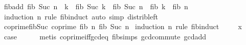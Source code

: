 \begin{isabellebody}
%
\isadelimproof
%
\endisadelimproof
%
\isadelimdocument
%
\endisadelimdocument
%
\isatagdocument
%
\isamarkuptrue%
%
\endisatagdocument
{\isafolddocument}%
%
\isadelimdocument
%
\endisadelimdocument
{}\isamarkupfalse%
\ fib{\isacharunderscore}{\kern0pt}add{\isacharcolon}{\kern0pt}\ {\isachardoublequoteopen}fib\ {\isacharparenleft}{\kern0pt}Suc\ {\isacharparenleft}{\kern0pt}n\ {\isacharplus}{\kern0pt}\ k{\isacharparenright}{\kern0pt}{\isacharparenright}{\kern0pt}\ {\isacharequal}{\kern0pt}\ fib\ {\isacharparenleft}{\kern0pt}Suc\ k{\isacharparenright}{\kern0pt}\ {\isacharasterisk}{\kern0pt}\ fib\ {\isacharparenleft}{\kern0pt}Suc\ n{\isacharparenright}{\kern0pt}\ {\isacharplus}{\kern0pt}\ fib\ k\ {\isacharasterisk}{\kern0pt}\ fib\ n{\isachardoublequoteclose}\isanewline
%
\isadelimproof
\ \ %
\endisadelimproof
%
\isatagproof
{}\isamarkupfalse%
\ {\isacharparenleft}{\kern0pt}induction\ n\ rule{\isacharcolon}{\kern0pt}\ fib{\isachardot}{\kern0pt}induct{\isacharparenright}{\kern0pt}\ {\isacharparenleft}{\kern0pt}auto\ simp{\isacharcolon}{\kern0pt}\ distrib{\isacharunderscore}{\kern0pt}left{\isacharparenright}{\kern0pt}%
\endisatagproof
{\isafoldproof}%
%
\isadelimproof
\isanewline
%
\endisadelimproof
\isanewline
{}\isamarkupfalse%
\ coprime{\isacharunderscore}{\kern0pt}fib{\isacharunderscore}{\kern0pt}Suc{\isacharcolon}{\kern0pt}\ {\isachardoublequoteopen}coprime\ {\isacharparenleft}{\kern0pt}fib\ n{\isacharparenright}{\kern0pt}\ {\isacharparenleft}{\kern0pt}fib\ {\isacharparenleft}{\kern0pt}Suc\ n{\isacharparenright}{\kern0pt}{\isacharparenright}{\kern0pt}{\isachardoublequoteclose}\isanewline
%
\isadelimproof
%
\endisadelimproof
%
\isatagproof
{}\isamarkupfalse%
\ {\isacharparenleft}{\kern0pt}induction\ n\ rule{\isacharcolon}{\kern0pt}\ fib{\isachardot}{\kern0pt}induct{\isacharparenright}{\kern0pt}\isanewline
\ \ \isamarkupfalse%
\ {\isacharparenleft}{\kern0pt}{}\ x{\isacharparenright}{\kern0pt}\isanewline
\ \ \isamarkupfalse%
\ \isamarkupfalse%
\ {\isacharquery}{\kern0pt}case\isanewline
\ \ \ \ \isamarkupfalse%
\ {\isacharparenleft}{\kern0pt}metis\ coprime{\isacharunderscore}{\kern0pt}iff{\isacharunderscore}{\kern0pt}gcd{\isacharunderscore}{\kern0pt}eq{\isacharunderscore}{\kern0pt}{}\ fib{\isachardot}{\kern0pt}simps{\isacharparenleft}{\kern0pt}{}{\isacharparenright}{\kern0pt}\ gcd{\isachardot}{\kern0pt}commute\ gcd{\isacharunderscore}{\kern0pt}add{}{\isacharparenright}{\kern0pt}\isanewline

\end{isabellebody}
